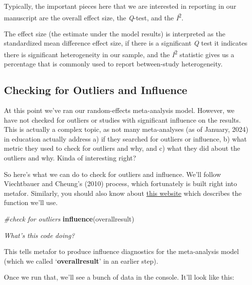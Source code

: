 \documentclass[
]{book}
\newenvironment{Shaded}{\begin{snugshade}}{\end{snugshade}}
\newcommand{\CommentTok}[1]{\textcolor[rgb]{0.56,0.35,0.01}{\textit{#1}}}
\newcommand{\FunctionTok}[1]{\textcolor[rgb]{0.13,0.29,0.53}{\textbf{#1}}}
\newcommand{\NormalTok}[1]{#1}
\begin{document}
Typically, the important pieces here that we are interested in reporting in our manuscript are the overall effect size, the \emph{Q}-test, and the \emph{I}\textsuperscript{2}.

The effect size (the estimate under the model results) is interpreted as the standardized mean difference effect size, if there is a significant \emph{Q} test it indicates there is significant heterogeneity in our sample, and the \emph{I}\textsuperscript{2} statistic gives us a percentage that is commonly used to report between-study heterogeneity.

\hypertarget{checking-for-outliers-and-influence}{%
\subsection{Checking for Outliers and Influence}\label{checking-for-outliers-and-influence}}

At this point we've ran our random-effects meta-analysis model. However, we have not checked for outliers or studies with significant influence on the results. This is actually a complex topic, as not many meta-analyses (as of January, 2024) in education actually address a) if they searched for outliers or influence, b) what metric they used to check for outliers and why, and c) what they did about the outliers and why. Kinda of interesting right?

So here's what we can do to check for outliers and influence. We'll follow Viechtbauer and Cheung's (2010) \citep{viechtbauer2010a} process, which fortunately is built right into metafor. Similarly, you should also know about \href{https://wviechtb.github.io/metafor/reference/influence.rma.uni.html}{this website} which describes the function we'll use.

\begin{Shaded}
\begin{Highlighting}[]
\CommentTok{\#check for outliers}
\FunctionTok{influence}\NormalTok{(overallresult)}
\end{Highlighting}
\end{Shaded}

\emph{What's this code doing?}

This tells metafor to produce influence diagnostics for the meta-analysis model (which we called `\textbf{overallresult}' in an earlier step).

Once we run that, we'll see a bunch of data in the console. It'll look like this:
\end{document}
